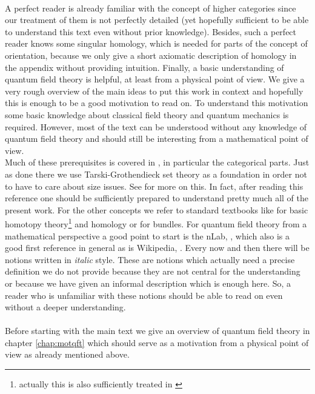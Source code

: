 \\
A perfect reader is already familiar with the concept of higher categories since our treatment of them is not perfectly detailed (yet hopefully sufficient to be able to understand this text even without prior knowledge). Besides, such a perfect reader knows some singular homology, which is needed for parts of the concept of orientation, because we only give a short axiomatic description of homology in the appendix without providing intuition. Finally, a basic understanding of quantum field theory is helpful, at least from a physical point of view. We give a very rough overview of the main ideas to put this work in context and hopefully this is enough to be a good motivation to read on. To understand this motivation some basic knowledge about classical field theory and quantum mechanics is required. However, most of the text can be understood without any knowledge of quantum field theory and should still be interesting from a mathematical point of view.
\\
Much of these prerequisites is covered in \cite{00000001}, in particular the categorical parts. Just as done there we use Tarski-Grothendieck set theory as a foundation in order not to have to care about {\glqq}size issues{\grqq}. See \cite{00000001} for more on this. In fact, after reading this reference one should be sufficiently prepared to understand pretty much all of the present work. For the other concepts we refer to standard textbooks like \cite{8b5861fc} for basic homotopy theory\footnote{actually this is also sufficiently treated in \cite{00000001}} and homology or \cite{f215dbd0} for bundles. For quantum field theory from a mathematical perspective a good point to start is the nLab, \cite{wiki-nlab0000}, which also is a good first reference in general as is Wikipedia, \cite{wiki-pedia0en}. Every now and then there will be notions written in \textit{italic} style. These are notions which actually need a precise definition we do not provide because they are not central for the understanding or because we have given an informal description which is enough here. So, a reader who is unfamiliar with these notions should be able to read on even without a deeper understanding.
\\\\
Before starting with the main text we give an overview of quantum field theory in chapter \ref{chap:motqft} which should serve as a motivation from a physical point of view as already mentioned above.
\\

